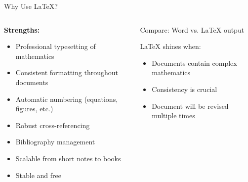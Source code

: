 \documentclass[ 9pt]{beamer}
\begin{document}
    \begin{frame}{Why Use LaTeX?}
        \begin{columns}
            \begin{column}{0.5\textwidth}
                \textbf{Strengths:}
                \begin{itemize}
                    \item \alert{Professional typesetting} of mathematics
                    \item Consistent formatting throughout documents
                    \item Automatic numbering (equations, figures, etc.)
                    \item Robust cross-referencing
                    \item Bibliography management
                    \item Scalable from short notes to books
                    \item Stable and free
                \end{itemize}
            \end{column}
            
            \begin{column}{0.5\textwidth}
                \begin{center}
                    Compare: Word vs. LaTeX output
                \end{center}
                
                \begin{alertblock}{LaTeX shines when:}
                    \begin{itemize}
                        \item Documents contain complex mathematics
                        \item Consistency is crucial
                        \item Document will be revised multiple times
                    \end{itemize}
                \end{alertblock}
            \end{column}
        \end{columns}
    \end{frame}
    
\end{document}
